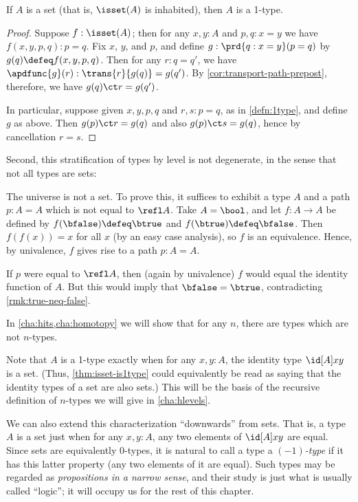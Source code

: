 \begin{lem}\label{thm:isset-is1type}
  If $A$ is a set (that is, $\isset(A)$ is inhabited), then $A$ is a 1-type.
\end{lem}
\begin{proof}
  Suppose $f:\isset(A)$; then for any $x,y:A$ and $p,q:x=y$ we have $f(x,y,p,q):p=q$.
  Fix $x$, $y$, and $p$, and define $g: \prd{q:x=y} (p=q)$ by $g(q) \defeq f (x,y,p,q)$.
  Then for any $r:q=q'$, we have $\apdfunc{g}(r) : \trans{r}{g(q)} = g(q')$.
  By \cref{cor:transport-path-prepost}, therefore, we have $g(q) \ct r = g(q')$.

  In particular, suppose given $x,y,p,q$ and $r,s:p=q$, as in \cref{defn:1type}, and define $g$ as above.
  Then $g(p) \ct r = g(q)$ and also $g(p) \ct s = g(q)$, hence by cancellation $r=s$.
\end{proof}

Second, this stratification of types by level is not degenerate, in the
sense that not all types are sets:

\begin{eg}\label{thm:type-is-not-a-set}
  The universe \type is not a set.
  To prove this, it suffices to exhibit a type $A$ and a path $p:A=A$ which is not equal to $\refl A$.
  Take $A=\bool$, and let $f:A\to A$ be defined by $f(\bfalse)\defeq \btrue$ and $f(\btrue)\defeq \bfalse$.
  Then $f(f(x))=x$ for all $x$ (by an easy case analysis), so $f$ is an equivalence.
  Hence, by univalence, $f$ gives rise to a path $p:A=A$.

  If $p$ were equal to $\refl A$, then (again by univalence) $f$ would equal the identity function of $A$.
  But this would imply that $\bfalse=\btrue$, contradicting \cref{rmk:true-neq-false}.
\end{eg}

In \cref{cha:hits,cha:homotopy} we will show that for any $n$, there are types which are not $n$-types.

Note that $A$ is a 1-type exactly when for any $x,y:A$, the identity type $\id[A]xy$ is a set.
(Thus, \cref{thm:isset-is1type} could equivalently be read as saying that the identity types of a set are also sets.)
This will be the basis of the recursive definition of $n$-types we will give in \cref{cha:hlevels}.

We can also extend this characterization ``downwards'' from sets.
That is, a type $A$ is a set just when for any $x,y:A$, any two elements of $\id[A]xy$ are equal.
Since sets are equivalently 0-types, it is natural to call a type a \emph{$(-1)$-type} if it has this latter property (any two elements of it are equal).
Such types may be regarded as \emph{propositions in a narrow sense}, and their study is just what is usually called ``logic''; it will occupy us for the rest of this chapter.

